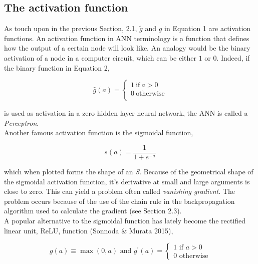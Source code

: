\documentclass[11pt, letterpaper]{amsart}
\begin{document}
\subsection{The activation function}
As touch upon in the previous Section, 2.1, $\widetilde{g}$ and $g$ in Equation 1 are activation functions. An activation function in ANN terminology is a function that defines how the output of a certain node will look like. An analogy would be the binary activation of a node in a computer circuit, which can be either $1$ or $0$. Indeed, if the binary function in Equation 2,

\begin{equation}
\hat{g}(a) = 
     \begin{cases}
       1 \ \text{if} \ a > 0 \\
       0 \ \text{otherwise} \\ 
     \end{cases}
\end{equation}

is used as activation in a zero hidden layer neural network, the ANN is called a \textit{Perceptron}.
\\

Another famous activation function is the sigmoidal function,

\begin{equation}
s(a) = \frac{1}{1 + e^{-a}}
\end{equation}

which when plotted forms the shape of an \textit{S}. Because of the geometrical shape of the sigmoidal activation function, it's derivative at small and large arguments is close to zero. This can yield a problem often called \textit{vanishing gradient}. The problem occurs because of the use of the chain rule in the backpropagation algorithm used to calculate the gradient (see Section 2.3).
\\

A popular alternative to the sigmoidal function has lately become the rectified linear unit, ReLU, function (Sonnoda \& Murata 2015),

\begin{equation}
    g(a) \equiv \max(0,a) \text{ and } g^{\prime}(a) =         \begin{cases}
            1 \text{ if } a > 0 \\
            0 \text{ otherwise}
        \end{cases}
\end{equation}
\end{document}
